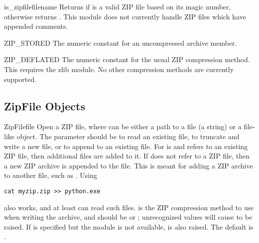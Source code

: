 \begin{funcdesc}{is_zipfile}{filename}
  Returns  if  is a valid ZIP file based on its magic
  number, otherwise returns .  This module does not currently
  handle ZIP files which have appended comments.
\end{funcdesc}

\begin{datadesc}{ZIP_STORED}
  The numeric constant for an uncompressed archive member.
\end{datadesc}

\begin{datadesc}{ZIP_DEFLATED}
  The numeric constant for the usual ZIP compression method.  This
  requires the zlib module.  No other compression methods are
  currently supported.
\end{datadesc}


\begin{seealso}

\end{seealso}


\subsection{ZipFile Objects \label{zipfile-objects}}

\begin{classdesc}{ZipFile}{file} 
  Open a ZIP file, where  can be either a path to a file
  (a string) or a file-like object.  The  parameter
  should be  to read an existing file,  to
  truncate and write a new file, or  to append to an
  existing file.  For  is  and 
  refers to an existing ZIP file, then additional files are added to
  it.  If  does not refer to a ZIP file, then a new ZIP
  archive is appended to the file.  This is meant for adding a ZIP
  archive to another file, such as .  Using

\begin{verbatim}
cat myzip.zip >> python.exe
\end{verbatim}

  also works, and at least  can read such files.
   is the ZIP compression method to use when writing
  the archive, and should be  or
  ; unrecognized values will cause
   to be raised.  If 
  is specified but the  module is not available,
   is also raised.  The default is
  . 
\end{classdesc}

